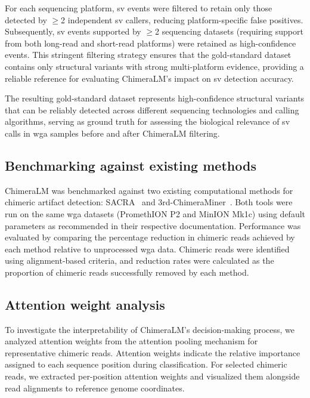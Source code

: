 \documentclass[pdflatex,sn-nature]{sn-jnl}%
\theoremstyle{thmstyleone}%
\theoremstyle{thmstyletwo}%
\theoremstyle{thmstylethree}%
\begin{document}
For each sequencing platform, \gls{sv} events were filtered to retain only those detected by $\geq$2 independent \gls{sv} callers, reducing platform-specific false positives.
Subsequently, \gls{sv} events supported by $\geq$2 sequencing datasets (requiring support from both long-read and short-read platforms) were retained as high-confidence events.
This stringent filtering strategy ensures that the gold-standard dataset contains only structural variants with strong multi-platform evidence, providing a reliable reference for evaluating ChimeraLM's impact on \gls{sv} detection accuracy.

The resulting gold-standard dataset represents high-confidence structural variants that can be reliably detected across different sequencing technologies and calling algorithms, serving as ground truth for assessing the biological relevance of \gls{sv} calls in \gls{wga} samples before and after ChimeraLM filtering.

\subsection*{Benchmarking against existing methods}

ChimeraLM was benchmarked against two existing computational methods for chimeric artifact detection: SACRA~\cite{kiguchi2021long} and 3rd-ChimeraMiner~\cite{lu2023exploration}.
Both tools were run on the same \gls{wga} datasets (PromethION P2 and MinION Mk1c) using default parameters as recommended in their respective documentation.
Performance was evaluated by comparing the percentage reduction in chimeric reads achieved by each method relative to unprocessed \gls{wga} data.
Chimeric reads were identified using alignment-based criteria, and reduction rates were calculated as the proportion of chimeric reads successfully removed by each method.

\subsection*{Attention weight analysis}

To investigate the interpretability of ChimeraLM's decision-making process, we analyzed attention weights from the attention pooling mechanism for representative chimeric reads.
Attention weights indicate the relative importance assigned to each sequence position during classification.
For selected chimeric reads, we extracted per-position attention weights and visualized them alongside read alignments to reference genome coordinates.
\end{document}
